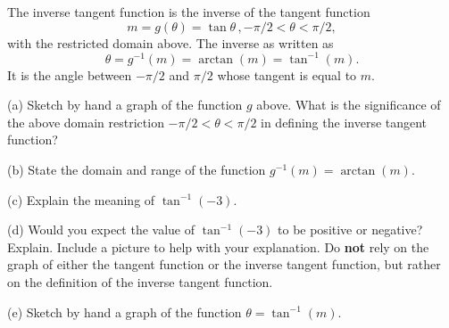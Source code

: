 \documentclass{ximera}
\begin{document}
The inverse tangent function is the inverse of the tangent function
\[
   m = g(\theta) = \tan \theta \, , -\pi/2 < \theta < \pi/2 ,
\]
with the restricted domain above. The inverse as written as
\[
    \theta = g^{-1}(m) = \arctan (m) = \tan^{-1}(m) .
\]
It is the angle between $-\pi/2$ and $\pi/2$ whose tangent is equal to $m$.

\begin{question} \label{Q12:InverseTrig}

(a) Sketch by hand a graph of the function $g$ above. What is the significance of the above domain restriction $-\pi/2 < \theta < \pi/2$  in defining the inverse tangent function?

(b) State the domain and range of the function $g^{-1}(m) = \arctan (m)$.

(c) Explain the meaning of $\tan^{-1}(-3)$.

(d) Would you expect the value of $\tan^{-1}(-3)$ to be positive or negative? Explain. Include a picture to help with your explanation. Do {\bf not} rely on the graph of either the tangent function or the inverse tangent function, but rather on the definition of the inverse tangent function. 

(e) Sketch by hand a graph of the function $\theta =  \tan^{-1}(m) $.

\end{question}
\end{document}

